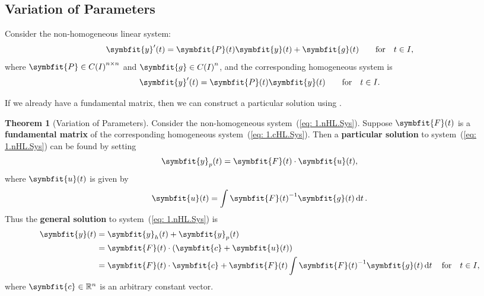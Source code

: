 \documentclass[10pt,UTF8]{article}
\newcommand{\mat}[1]{\symbfit{#1}}
\renewcommand{\vec}[1]{%
  \ifnum0\ifcat#1a1\else0\fi>0
  \symbfit{#1}  %
  \else
  \symbf{#1}  %
  \fi
}
\newenvironment{theoremBox}
{ \bigskip
  \begin{tcolorbox}[colback=yellow!5!white,colframe=yellow!75!black,parbox=false,before
  upper=\par,before lower=\par]}
  {
\end{tcolorbox}}
\theoremstyle{definition}
\newtheorem{definition inner}{Definition}[section]
\theoremstyle{definition}
\newtheorem{theorem inner}{Theorem}[section]
\newenvironment{theorem}[1][]
{
  \begin{theoremBox}
  \begin{theorem inner}[#1]\hfill\par}
    {
    \end{theorem inner}
\end{theoremBox}}
\theoremstyle{definition}
\newtheorem*{proof inner}{\textit{Proof}}
\theoremstyle{plain}
\newtheorem{tip inner}{Tip}[section]
\theoremstyle{remark}
\begin{document}
\subsection{Variation of Parameters}

Consider the non-homogeneous linear system:
\begin{equation}
  \vec{y}'(t) = \mat{P}(t) \vec{y}(t) + \vec{g}(t) \quad \qfor t\in I,
  \label{eq: 1.nHL.Sys}
\end{equation}
where \(\mat{P} \in {C(I)}^{n \times n}\) and
\(\vec{g} \in {C(I)}^n\),
and the corresponding homogeneous system is
\begin{equation}
  \vec{y}'(t) = \mat{P}(t) \vec{y}(t) \quad \qfor t\in I.
  \label{eq: 1.cHL.Sys}
\end{equation}

If we already have a fundamental matrix,
then we can construct a particular solution using
.

\begin{theorem}[Variation of Parameters]
  {}\label{thm: Variation of Parameters}
  Consider the non-homogeneous system~(\ref{eq: 1.nHL.Sys}).
  Suppose \(\mat{F}(t)\) is a \textbf{fundamental matrix}
  of the corresponding homogeneous system~(\ref{eq: 1.cHL.Sys}).
  Then a \textbf{particular solution} to system~(\ref{eq: 1.nHL.Sys})
  can be found by setting
  \begin{equation*}
    \vec{y}_p(t) = \mat{F}(t) \cdot \vec{u}(t),
  \end{equation*}
  where \(\vec{u}(t)\) is given by
  \begin{equation*}
    \vec{u}(t) = \int {\mat{F}(t)}^{-1} \vec{g}(t) \dd{t}.
  \end{equation*}
  Thus the \textbf{general solution} to system~(\ref{eq: 1.nHL.Sys}) is
  \begin{align*}
    \vec{y}(t) &= \vec{y}_h(t) + \vec{y}_p(t) \\
    &= \mat{F}(t) \cdot (\vec{c} + \vec{u}(t)) \\
    &= \mat{F}(t) \cdot \vec{c} + \mat{F}(t) \int {\mat{F}(t)}^{-1}
    \vec{g}(t) \dd{t}
    \qfor t\in I,
  \end{align*}
  where \(\vec{c} \in \mathbb{R}^n\) is an arbitrary constant vector.
\end{theorem}
\end{document}

